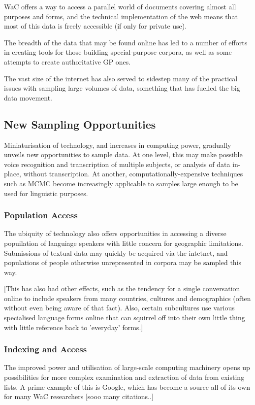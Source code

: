 WaC offers a way to access a parallel world of documents covering almost all purposes and forms, and the technical implementation of the web means that most of this data is freely accessible (if only for private use).

The breadth of the data that may be found online has led to a number of efforts in creating tools for those building special-purpose corpora, as well as some attempts to create authoritative GP ones.

The vast size of the internet has also served to sidestep many of the practical issues with sampling large volumes of data, something that has fuelled the big data movement.  




\subsection{New Sampling Opportunities}
Miniaturisation of technology, and increases in computing power, gradually unveils new opportunities to sample data.  At one level, this may make possible voice recognition and transcription of multiple subjects, or analysis of data in-place, without transcription.  At another, computationally-expensive techniques such as MCMC become increasingly applicable to samples large enough to be used for linguistic purposes.


\subsubsection{Population Access}
The ubiquity of technology also offers opportunities in accessing a diverse popuilation of languiage speakers with little concern for geographic limitations.  Submissions of textual data may quickly be acquired via the intetnet, and populations of people otherwise unrepresented in corpora may be sampled this way.

[This has also had other effects, such as the tendency for a single conversation online to include speakers from many countries, cultures and demographics (often without even being aware of that fact).  Also, certain subcultures use various specialised language forms online that can squirrel off into their own little thing with little reference back to 'everyday' forms.]



\subsubsection{Indexing and Access}
The improved power and utilisation of large-scale computing machinery opens up possibilities for more complex examination and extraction of data from existing lists.  A prime example of this is Google, which has become a source all of its own for many WaC researchers [sooo many citations..]

